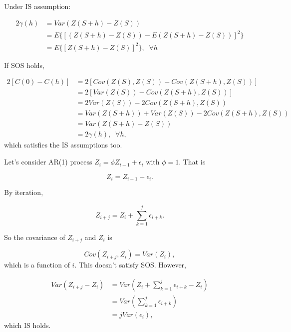 \documentclass{article}
\begin{document}
\begin{appendices}
Under IS assumption:

\begin{align}
2\gamma(h) & = Var(Z(S+h)-Z(S)) \\
& = E\{[ (Z(S+h)-Z(S))-E(Z(S+h)-Z(S)) ]^2\}\\
& = E\{[Z(S+h)-Z(S)]^2\},\;\;\forall h
\end{align}

If SOS holds, 

\begin{align}
2[C(0)-C(h)] & =2[Cov(Z(S),Z(S))-Cov(Z(S+h),Z(S))]\\
& = 2[Var(Z(S))-Cov(Z(S+h),Z(S))]\\
& = 2Var(Z(S)) - 2 Cov(Z(S+h),Z(S))\\
& = Var(Z(S+h)) + Var(Z(S)) - 2 Cov(Z(S+h),Z(S))\\
& = Var(Z(S+h)-Z(S))\\
& = 2\gamma(h),\;\;\forall h,
\end{align}
which satisfies the IS assumptions too. 

Let's consider AR(1) process  $Z_i = \phi Z_{i-1}+\epsilon_i$ with $\phi=1$. That is 

\begin{equation}
Z_i = Z_{i-1}+\epsilon_i.
\end{equation}

By iteration,

\begin{equation}
Z_{i +j} = Z_i + \sum_{k=1}^j \epsilon_{i+k}.
\end{equation}

So the covariance of $Z_{i+j}$ and $Z_i$ is

\begin{equation}
Cov(Z_{i+j},Z_i) = Var(Z_i),
\end{equation}
which is a function of $i$. This doesn't satisfy SOS. However, 

\begin{align}
Var(Z_{i+j}-Z_i) & = Var(Z_i + \sum_{k=1}^j \epsilon_{i+k}-Z_i)\\
 & = Var(\sum_{k=1}^j \epsilon_{i+k})\\
 & = jVar(\epsilon_i),
\end{align}
which IS holds.

\end{appendices}

\newpage

\end{document}
